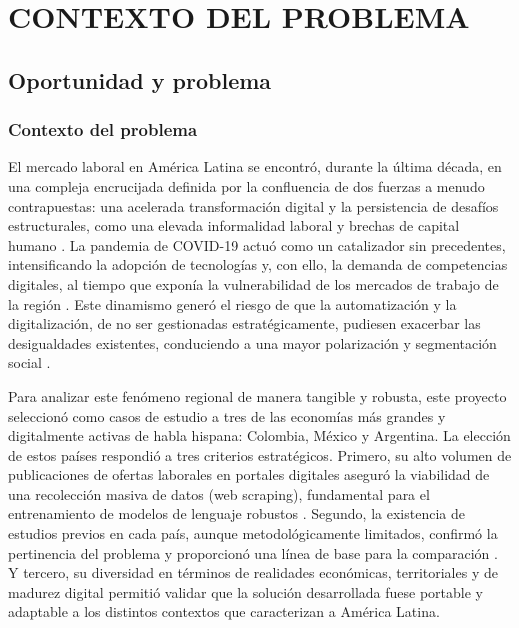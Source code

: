 \chapter{CONTEXTO DEL PROBLEMA}

\section{Oportunidad y problema}

\subsection{Contexto del problema}

El mercado laboral en América Latina se encontró, durante la última década, en una compleja encrucijada definida por la confluencia de dos fuerzas a menudo contrapuestas: una acelerada transformación digital y la persistencia de desafíos estructurales, como una elevada informalidad laboral y brechas de capital humano \parencite{echeverria2022}. La pandemia de COVID-19 actuó como un catalizador sin precedentes, intensificando la adopción de tecnologías y, con ello, la demanda de competencias digitales, al tiempo que exponía la vulnerabilidad de los mercados de trabajo de la región \parencite{azuara2022}. Este dinamismo generó el riesgo de que la automatización y la digitalización, de no ser gestionadas estratégicamente, pudiesen exacerbar las desigualdades existentes, conduciendo a una mayor polarización y segmentación social \parencite{echeverria2022}.

Para analizar este fenómeno regional de manera tangible y robusta, este proyecto seleccionó como casos de estudio a tres de las economías más grandes y digitalmente activas de habla hispana: Colombia, México y Argentina. La elección de estos países respondió a tres criterios estratégicos. Primero, su alto volumen de publicaciones de ofertas laborales en portales digitales aseguró la viabilidad de una recolección masiva de datos (web scraping), fundamental para el entrenamiento de modelos de lenguaje robustos \parencite{aguilera2018, martinez2024, rubio2024}. Segundo, la existencia de estudios previos en cada país, aunque metodológicamente limitados, confirmó la pertinencia del problema y proporcionó una línea de base para la comparación \parencite{cardenas2015}. Y tercero, su diversidad en términos de realidades económicas, territoriales y de madurez digital permitió validar que la solución desarrollada fuese portable y adaptable a los distintos contextos que caracterizan a América Latina.

